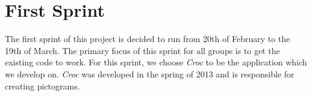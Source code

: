 \chapter{First Sprint}
The first sprint of this project is decided to run from 20th of February to the 19th of March.
The primary focus of this sprint for all groups is to get the existing code to work.
For this sprint, we choose \textit{Croc} \citep{misc:crocold} to be the application which we develop on.
\textit{Croc} was developed in the spring of 2013 and is responsible for creating pictograms.




